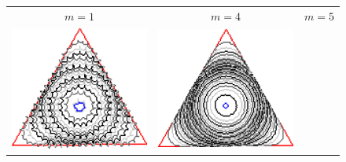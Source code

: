 \begin{figure}
\center
\begin{tabular}{ccc}
$m=1$ & $m=4$ & $m=5$\\
\includegraphics[scale=0.22]{figures/chapter6/level-effect/triangle/improve/len_pen0/radius-5/level1/summary.pdf} &
\includegraphics[scale=0.22]{figures/chapter6/level-effect/triangle/improve/len_pen0/radius-5/level4/summary.pdf} &

\end{tabular}
\end{figure}

